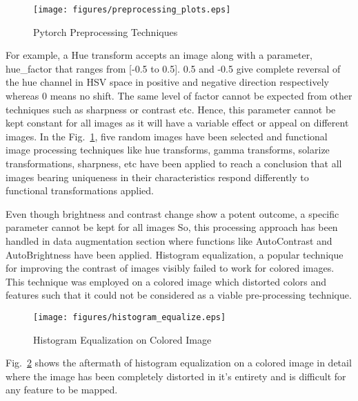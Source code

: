 \documentclass[conference]{IEEEtran}
\begin{document}
\begin{figure}[htbp]
    \texttt{[image: figures/preprocessing\_plots.eps]}
    \caption{Pytorch Preprocessing Techniques}
    \label{fig:preprocessing_plots}
    \end{figure}

For example, a Hue transform accepts an image along with a parameter, hue\_factor 
that ranges from [-0.5 to 0.5]. 0.5 and -0.5 give complete reversal of the hue channel 
in HSV space in positive and negative direction respectively whereas 0 means no shift. 
The same level of factor cannot be expected from other techniques such as sharpness 
or contrast etc. Hence, this parameter cannot be kept constant for all images as it 
will have a variable effect or appeal on different images. In the Fig.~\ref{fig:preprocessing_plots}, 
five random images have been selected and functional image processing techniques like 
hue transforms, gamma transforms, solarize transformations, sharpness, etc 
have been applied to reach a conclusion that all images bearing uniqueness in their 
characteristics respond differently to functional transformations applied.

Even though brightness and contrast change show a potent outcome, a specific parameter 
cannot be kept for all images So, this processing approach has been handled in data 
augmentation section where functions like AutoContrast and AutoBrightness have been applied. 
Histogram equalization, a popular technique for improving the contrast of images visibly 
failed to work for colored images. This technique was employed on a colored image which 
distorted colors and features such that it could not be considered as a viable pre-processing technique.

\begin{figure}[htbp] 
    \texttt{[image: figures/histogram\_equalize.eps]} 
    \caption{Histogram Equalization on Colored Image} 
    \label{fig:histogram_equalize}
    \end{figure}

Fig.~\ref{fig:histogram_equalize} shows the aftermath of histogram equalization on a 
colored image in detail where the image has been completely distorted in it's entirety 
and is difficult for any feature to be mapped.
\end{document}
